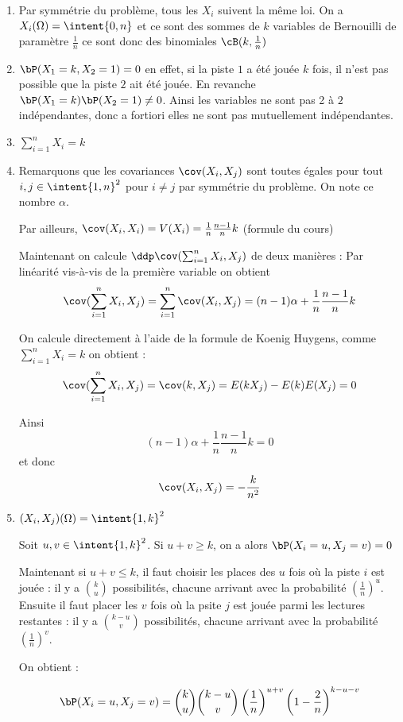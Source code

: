 \begin{correction}
\begin{enumerate}
\item Par symmétrie du problème, tous les $X_i$ suivent la même loi. On a $X_i (\Omega) =\intent{0,n}$ et ce sont des sommes de  $k$ variables de Bernouilli de paramètre $\frac{1}{n}$ ce sont donc des binomiales $\cB(k,\frac{1}{n})$
\item $\bP (X_1 = k , X_2=1)=0$ en effet, si la piste $1$ a été jouée  $k$ fois, il n'est pas possible que la piste $2$ ait été jouée. En revanche $\bP(X_1=k)\bP(X_2=1) \neq 0$. Ainsi les variables ne sont pas 2 à $2$ indépendantes, donc a fortiori elles ne sont pas mutuellement indépendantes. 
\item $\sum_{i=1}^n X_i = k$
\item Remarquons que les covariances $\cov(X_i,X_j) $ sont toutes égales pour tout $i, j \in \intent{1, n}^2$ pour $i\neq  j$  par symmétrie du problème. On note ce nombre $\alpha$. 

Par ailleurs, $\cov(X_i,X_i) = V(X_i)=\frac{1}{n}\frac{n-1}{n} k $ (formule du cours) 

Maintenant on calcule $\ddp \cov(\sum_{i=1}^n X_i,X_j)$ de deux manières : 
Par linéarité vis-à-vis de la première variable   on obtient 
$$ \cov(\sum_{i=1}^n X_i,X_j) =\sum_{i=1}^n \cov(X_i,X_j) =(n-1) \alpha +\frac{1}{n}\frac{n-1}{n} k$$

On calcule directement à l'aide de la formule de Koenig Huygens, comme $\sum_{i=1}^n X_i = k$ on obtient : 
$$\cov(\sum_{i=1}^n X_i,X_j) = \cov(k,X_j) = E(kX_j)-E(k)E(X_j)  = 0$$


Ainsi 
$$ (n-1) \alpha +\frac{1}{n}\frac{n-1}{n} k  =0$$ et donc 
$$ \cov(X_i,X_j)   = -\frac{k}{n^2}$$

\item $(X_i,X_j) (\Omega) =\intent{1,k}^2$ 

Soit $u,v \in \intent{1,k}^2$. 
 Si $u+v\geq k$, on a alors $\bP(X_i = u ,X_j= v) = 0 $

Maintenant si $u+v\leq k$, il faut choisir les places des $u$ fois où la piste $i$ est jouée : il y a 
$\binom{k}{u} $ possibilités, chacune arrivant avec la probabilité $(\frac{1}{n})^{u}$. Ensuite il faut placer les $v$ fois où la psite $j$ est jouée parmi les lectures restantes : il y a  $\binom{k-u}{v} $ possibilités, chacune arrivant avec la probabilité $(\frac{1}{n})^{v}$. 

On obtient : 

$$\bP(X_i = u , X_j = v) =\binom{k}{u}\binom{k-u}{v} \left(\frac{1}{n}\right)^{u+v} \left(1-\frac{2}{n}\right)^{k-u-v}$$



\end{enumerate}
\end{correction}
